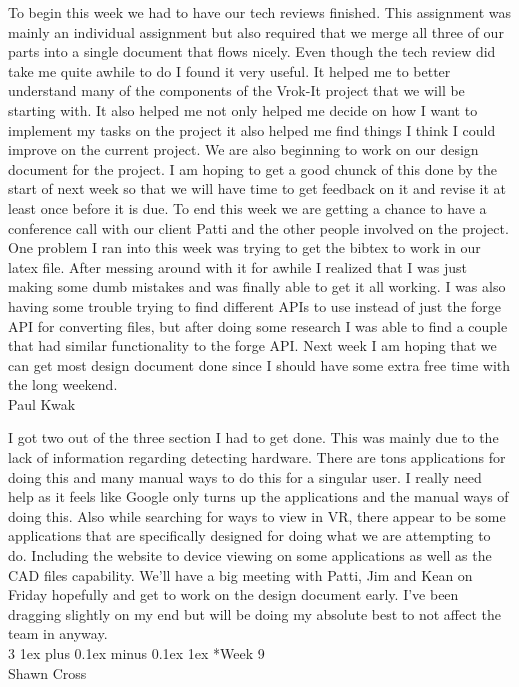 \documentclass[letterpaper, 10pt, draftclsnofoot, compsoc, onecolumn]{IEEEtran}
\makeatletter
\def\subsubsection{\@startsection{subsubsection}%
                                 {3}%
                                 {\z@}%
                                 {1ex plus 0.1ex minus 0.1ex}%
                                 {1ex}%
                                 {\normalfont\normalsize}}%
\makeatother
\begin{document}
To begin this week we had to have our tech reviews finished. This assignment was mainly an individual assignment but also required that we merge all three of our parts into a single document that flows nicely. Even though the tech review did take me quite awhile to do I found it very useful. It helped me to better understand many of the components of the Vrok-It project that we will be starting with. It also helped me not only helped me decide on how I want to implement my tasks on the project it also helped me find things I think I could improve on the current project. We are also beginning to work on our design document for the project. I am hoping to get a good chunck of this done by the start of next week so that we will have time to get feedback on it and revise it at least once before it is due. To end this week we are getting a chance to have a conference call with our client Patti and the other people involved on the project. One problem I ran into this week was trying to get the bibtex to work in our latex file. After messing around with it for awhile I realized that I was just making some dumb mistakes and was finally able to get it all working. I was also having some trouble trying to find different APIs to use instead of just the forge API for converting files, but after doing some research I was able to find a couple that had similar functionality to the forge API. Next week I am hoping that we can get most design document done since I should have some extra free time with the long weekend.\\

Paul Kwak

I got two out of the three section I had to get done. This was mainly due to the lack of information regarding detecting hardware. There are tons applications for doing this and many manual ways to do this for a singular user. I really need help as it feels like Google only turns up the applications and the manual ways of doing this. Also while searching for ways to view in VR, there appear to be some applications that are specifically designed for doing what we are attempting to do. Including the website to device viewing on some applications as well as the CAD files capability. We'll have a big meeting with Patti, Jim and Kean on Friday hopefully and get to work on the design document early. I've been dragging slightly on my end but will be doing my absolute best to not affect the team in anyway.\\


\subsubsection*{Week 9}\hspace*{\fill} \\
Shawn Cross
\end{document}
